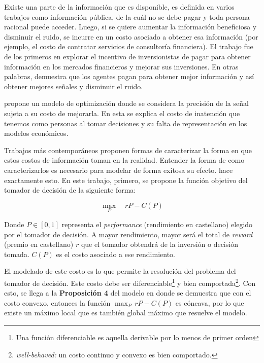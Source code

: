 Existe una parte de la información que es disponible, es definida en varios trabajos como información pública, de la cuál no se debe pagar y toda persona racional puede acceder. Luego, si se quiere aumentar la información beneficiosa y disminuir el ruido, se incurre en un costo asociado a obtener esa información (por ejemplo, el costo de contratar servicios de consultoría financiera). El trabajo  fue de los primeros en explorar el incentivo de inversionistas de pagar para obtener información en los mercados financieros y mejorar sus inversiones. En otras palabras, demuestra que los agentes pagan para obtener mejor información y así obtener mejores señales y disminuir el ruido. 
\vspace{2.5mm}

 propone un modelo de optimización donde se considera la precisión de la señal sujeta a su costo de mejorarla. En esta se explica el costo de inatención que tenemos como personas al tomar decisiones y su falta de representación en los modelos económicos.
\vspace{2.5mm}

Trabajos más contemporáneos proponen formas de caracterizar la forma en que estos costos de información toman en la realidad. Entender la forma de como caracterizarlos es necesario para modelar de forma exitosa su efecto.  hace exactamente esto. En este trabajo, primero, se propone la función objetivo del tomador de decisión de la siguiente forma: 

$$\max_{P}\quad rP-C(P)$$

Donde $P \in [0,1]$ representa el \textit{performance} (rendimiento en castellano) elegido por el tomador de decisión. A mayor rendimiento, mayor será el total de \textit{reward} (premio en castellano) $r$ que el tomador obtendrá de la inversión o decisión tomada. $C(P)$ es el costo asociado a ese rendimiento. 
\vspace{2.5mm}

El modelado de este costo es lo que permite la resolución del problema del tomador de decisión. Este costo debe ser diferenciable\footnote{Una función diferenciable es aquella derivable por lo menos de primer orden} y bien comportada\footnote{\textit{well-behaved:} un costo continuo y convexo es bien comportado. }. Con esto, se llega a la \textbf{Proposición 4} del modelo en  donde se demuestra que con el costo convexo, entonces la función $\max_{P}\, rP-C(P)$ es cóncava, por lo que existe un máximo local que es también global máximo que resuelve el modelo.
\vspace{2.5mm}

